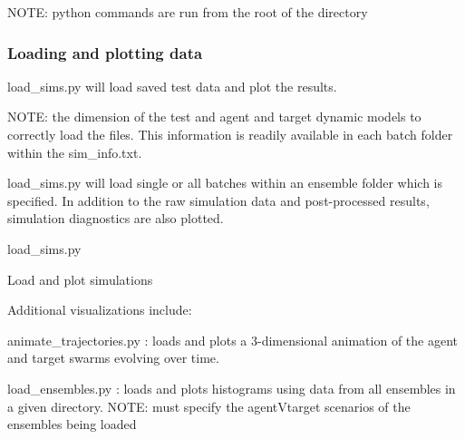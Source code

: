 N\+O\+TE\+: python commands are run from the root of the directory

\subsubsection*{Loading and plotting data}

load\+\_\+sims.\+py will load saved test data and plot the results.

N\+O\+TE\+: the dimension of the test and agent and target dynamic models to correctly load the files. This information is readily available in each batch folder within the sim\+\_\+info.\+txt.

load\+\_\+sims.\+py will load single or all batches within an ensemble folder which is specified. In addition to the raw simulation data and post-\/processed results, simulation diagnostics are also plotted.

load\+\_\+sims.\+py 
\begin{DoxyCode}{0}
\DoxyCodeLine{\#\#\#\#\#\#\#\#\#\#\#\#\#\#\#\#\#\#\#\#\#\#\#\#\#\#\#\#\#\#\#\#\#\#\#\#\#\#\#\#\#\#\#\#\#\#\#\#\#\#\#\#\#\#\#\#\#\#\#\#\#\#\#\#\#\#\#\#\#\#\#\#\#}
\DoxyCodeLine{}
\DoxyCodeLine{}
\DoxyCodeLine{}
\DoxyCodeLine{}
\DoxyCodeLine{\#\#\#\#\#\#\#\#\#\#\#\#\#\#\#\#\#\#\#\#\#\#\#\#\#\#\#\#\#\#\#\#\#\#\#\#\#\#\#\#\#\#\#\#\#\#\#\#\#\#\#\#\#\#\#\#\#\#\#\#\#\#\#\#\#\#\#\#\#\#\#\#\#}
\end{DoxyCode}


Load and plot simulations 
\begin{DoxyCode}{0}
\end{DoxyCode}


Additional visualizations include\+:
\begin{DoxyItemize}
\item animate\+\_\+trajectories.\+py \+: loads and plots a 3-\/dimensional animation of the agent and target swarms evolving over time.
\item load\+\_\+ensembles.\+py \+: loads and plots histograms using data from all ensembles in a given directory. N\+O\+TE\+: must specify the \textquotesingle{}agent\textquotesingle{}V\textquotesingle{}target\textquotesingle{} scenarios of the ensembles being loaded
\end{DoxyItemize}

